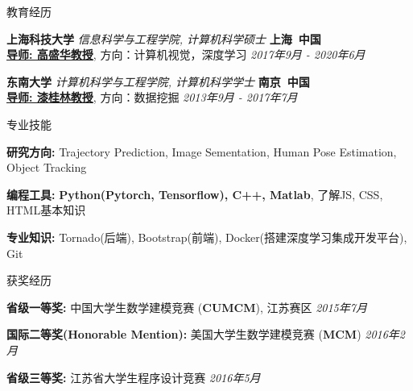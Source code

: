 \documentclass{resume_ch} %
\begin{document}



\begin{rSection}{教育经历}

    {\bf 上海科技大学} {\em 信息科学与工程学院, 计算机科学硕士} \hfill {\bf 上海\ 中国} \\
    \href{http://www.shanghaitech.edu.cn/eng/faculty/sist/people/212.html}{\textbf{导师: 高盛华教授}}, 方向：计算机视觉，深度学习 \hfill {\em 2017年9月 - 2020年6月}
    
    {\bf 东南大学} {\em 计算机科学与工程学院, 计算机科学学士} \hfill {\bf 南京\ 中国}\\
    \href{http://cse.seu.edu.cn/people/qgl/index_en.htm}{\textbf{导师: 漆桂林教授}}, 方向：数据挖掘 \hfill {\em 2013年9月 - 2017年7月}
\end{rSection}


\begin{rSection}{专业技能} \itemsep -5pt {} 
\item \textbf{研究方向:} Trajectory Prediction, Image Sementation, Human Pose Estimation, Object Tracking
\item \textbf{编程工具:} \textbf{Python(Pytorch, Tensorflow), C++, Matlab}, 了解JS, CSS, HTML基本知识
\item \textbf{专业知识:} Tornado(后端), Bootstrap(前端), Docker(搭建深度学习集成开发平台), Git
\end{rSection}

\begin{rSection}{获奖经历}  \itemsep -5pt {} 
    \item {\bf 省级一等奖:} 中国大学生数学建模竞赛 (\textbf{CUMCM}), 江苏赛区 \hfill {\em 2015年7月}
    \item {\bf 国际二等奖(Honorable Mention):} 美国大学生数学建模竞赛 (\textbf{MCM}) \hfill {\em 2016年2月}
    \item {\bf 省级三等奖:} 江苏省大学生程序设计竞赛 \hfill {\em 2016年5月}
\end{rSection} 
\end{document}

